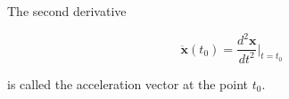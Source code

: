 The second derivative

$$\ddot{\mathbf{x}}(t_0) = \frac{d^2\mathbf{x}}{dt^2} \bigg|_{t=t_0}$$

is called the acceleration vector at the point $t_0$.
